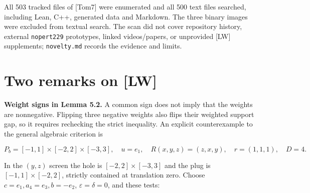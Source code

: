 \documentclass[
  10pt,
  a4paper,
]{article}
\begin{document}
All 503 tracked files of {[}Tom7{]} were enumerated and all 500 text
files searched, including Lean, C++, generated data and Markdown. The
three binary images were excluded from textual search. The scan did not
cover repository history, external \texttt{nopert229} prototypes, linked
videos/papers, or unprovided {[}LW{]} supplements; \texttt{novelty.md}
records the evidence and limits.

\newpage

\section{Two remarks on {[}LW{]}}\label{two-remarks-on-lw}

\textbf{Weight signs in Lemma 5.2.} A common sign does not imply that
the weights are nonnegative. Flipping three negative weights also flips
their weighted support gap, so it requires rechecking the strict
inequality. An explicit counterexample to the general algebraic
criterion is

\[P_b=[-1,1]\times[-2,2]\times[-3,3],\quad u=e_1,\quad
R(x,y,z)=(z,x,y),\quad r=(1,1,1),\quad D=4.\]

In the \((y,z)\) screen the hole is \([-2,2]\times[-3,3]\) and the plug
is \([-1,1]\times[-2,2]\), strictly contained at translation zero.
Choose \(c=e_1,a_4=e_3,b=-e_2\), \(\varepsilon=\delta=0\), and these
tests:
\end{document}

